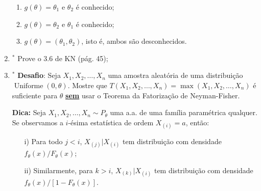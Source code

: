 \documentclass[a4paper,10pt, notitlepage]{report}
\newcommand{\rs}{X_1, X_2, \ldots, X_n} %
\begin{document}
\begin{enumerate}
    \begin{enumerate}
        \item $g(\theta) = \theta_1$ e $\theta_2$ é conhecido;
        \item $g(\theta) = \theta_2$ e $\theta_1$ é conhecido;
        \item $g(\theta) = (\theta_1, \theta_2)$, isto é, ambos são desconhecidos.
    \end{enumerate}
    \item $^\ast$ Prove o 3.6 de KN (pág. 45);
    \item $^\ast$ \textbf{Desafio}: Seja $\rs$ uma amostra aleatória de uma distribuição $\operatorname{Uniforme}(0, \theta)$. 
    Mostre que $T(\rs) = \max(\rs)$ é suficiente para $\theta$ \underline{\textbf{sem}} usar o Teorema da Fatorização de Neyman-Fisher.
    
    \textbf{Dica:} Seja $\rs \sim P_\theta$ uma a.a. de uma família paramétrica qualquer.
    Se observamos a $i$-ésima estatística de ordem $X_{(i)} = a$, então:
    \begin{itemize}
        \item[i)] Para todo $j< i$, $X_{(j)} | X_{(i)}$ tem distribuição com densidade $f_\theta(x)/F_\theta(x)$;
        \item[ii)] Similarmente, para $k > i$, $X_{(k)} | X_{(i)}$ tem distribuição com densidade $f_\theta(x)/[1-F_\theta(x)]$.
    \end{itemize}
\end{enumerate}



% 
% 
\end{document}
